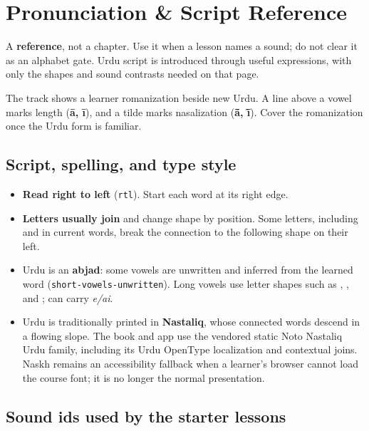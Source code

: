 
\chapter*{Pronunciation \& Script Reference}

A \textbf{reference}, not a chapter. Use it when a lesson names a sound; do not clear it as an alphabet gate. Urdu script is introduced through useful expressions, with only the shapes and sound contrasts needed on that page.

The track shows a learner romanization beside new Urdu. A line above a vowel marks length (\textbf{ā, ī}), and a tilde marks nasalization (\textbf{ā̃, ī̃}). Cover the romanization once the Urdu form is familiar.

\section*{Script, spelling, and type style}

\begin{itemize}
\raggedright
\setlength{\itemsep}{0.35em}
  \item \textbf{Read right to left} (\texttt{rtl}). Start each word at its right edge.
  \item \textbf{Letters usually join} and change shape by position. Some letters, including \textbf{} and \textbf{} in current words, break the connection to the following shape on their left.
  \item Urdu is an \textbf{abjad}: some vowels are unwritten and inferred from the learned word (\texttt{short-vowels-unwritten}). Long vowels use letter shapes such as \textbf{}, \textbf{}, and \textbf{}; \textbf{} can carry \emph{e/ai}.
  \item Urdu is traditionally printed in \textbf{Nastaliq}, whose connected words descend in a flowing slope. The book and app use the vendored static Noto Nastaliq Urdu family, including its Urdu OpenType localization and contextual joins. Naskh remains an accessibility fallback when a learner's browser cannot load the course font; it is no longer the normal presentation.
\end{itemize}

\section*{Sound ids used by the starter lessons}

